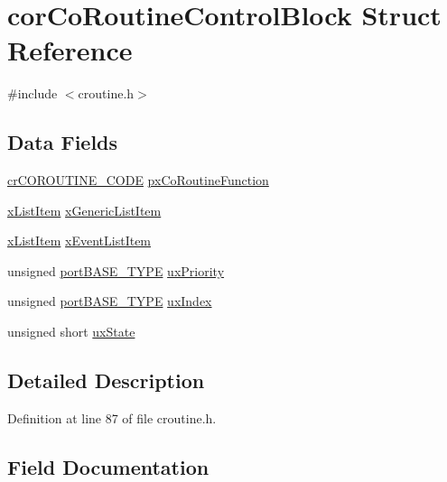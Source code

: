 \hypertarget{structcorCoRoutineControlBlock}{}\section{cor\+Co\+Routine\+Control\+Block Struct Reference}
\label{structcorCoRoutineControlBlock}


{\ttfamily \#include $<$croutine.\+h$>$}

\subsection*{Data Fields}
\begin{DoxyCompactItemize}
\item 
\hyperlink{croutine_8h_a8e0f640ebfe355ce6ad2555fc94a4a9e}{cr\+C\+O\+R\+O\+U\+T\+I\+N\+E\+\_\+\+C\+O\+DE} \hyperlink{structcorCoRoutineControlBlock_acc98c7364cd88e8e034a5f9bba113832}{px\+Co\+Routine\+Function}
\item 
\hyperlink{list_8h_abc3e65a10b5c5f39142e64e69311797f}{x\+List\+Item} \hyperlink{structcorCoRoutineControlBlock_ad088a2410ffd125ce32562e2faa4861d}{x\+Generic\+List\+Item}
\item 
\hyperlink{list_8h_abc3e65a10b5c5f39142e64e69311797f}{x\+List\+Item} \hyperlink{structcorCoRoutineControlBlock_ae3df50ba6714e9c2683cefa31dc0bc50}{x\+Event\+List\+Item}
\item 
unsigned \hyperlink{portmacro_8h_a1ebe82d24d764ae4e352f7c3a9f92c01}{port\+B\+A\+S\+E\+\_\+\+T\+Y\+PE} \hyperlink{structcorCoRoutineControlBlock_af736666edff352eba690b3a5878bbdde}{ux\+Priority}
\item 
unsigned \hyperlink{portmacro_8h_a1ebe82d24d764ae4e352f7c3a9f92c01}{port\+B\+A\+S\+E\+\_\+\+T\+Y\+PE} \hyperlink{structcorCoRoutineControlBlock_a9f4a873d7b5447f3677639080c8f5f51}{ux\+Index}
\item 
unsigned short \hyperlink{structcorCoRoutineControlBlock_adb706fe642d1c39528402ec6393fcaa9}{ux\+State}
\end{DoxyCompactItemize}


\subsection{Detailed Description}


Definition at line 87 of file croutine.\+h.



\subsection{Field Documentation}
\mbox{\label{structcorCoRoutineControlBlock_acc98c7364cd88e8e034a5f9bba113832}} 

